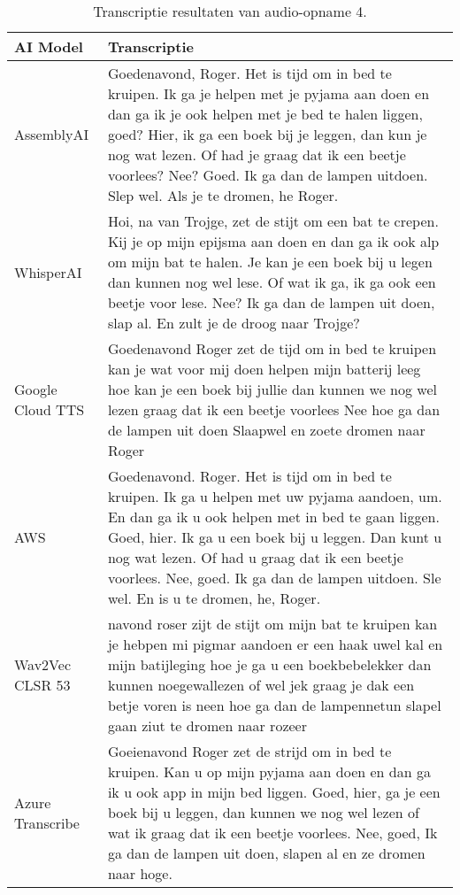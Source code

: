 \begin{table}[htbp]
    \centering
    \caption{Transcriptie resultaten van audio-opname 4.}
    \label{tab:results_sample4}
    \begin{tabularx}{\textwidth}{|l|X|}
        \hline
        \textbf{AI Model} & \textbf{Transcriptie} \\
 \hline
 AssemblyAI &  Goedenavond, Roger. Het is tijd om in bed te kruipen. Ik ga je helpen met je pyjama aan doen en dan ga ik je ook helpen met je bed te halen liggen, goed? Hier, ik ga een boek bij je leggen, dan kun je nog wat lezen. Of had je graag dat ik een beetje voorlees? Nee? Goed. Ik ga dan de lampen uitdoen. Slep wel. Als je te dromen, he Roger.
 

\\ \hline

WhisperAI &    Hoi, na van Trojge, zet de stijt om een bat te crepen. Kij je op mijn epijsma aan doen en dan ga ik ook alp om mijn bat te halen. Je kan je een boek bij u legen dan kunnen nog wel lese. Of wat ik ga, ik ga ook een beetje voor lese. Nee? Ik ga dan de lampen uit doen, slap al. En zult je de droog naar Trojge?


\\ \hline

Google Cloud TTS &   Goedenavond Roger zet de tijd om in bed te kruipen kan je wat voor mij doen helpen mijn batterij leeg hoe kan je een boek bij jullie dan kunnen we nog wel lezen graag dat ik een beetje voorlees Nee hoe ga dan de lampen uit doen Slaapwel en zoete dromen naar Roger


\\ \hline

AWS &   Goedenavond. Roger. Het is tijd om in bed te kruipen. Ik ga u helpen met uw pyjama aandoen, um. En dan ga ik u ook helpen met in bed te gaan liggen. Goed, hier. Ik ga u een boek bij u leggen. Dan kunt u nog wat lezen. Of had u graag dat ik een beetje voorlees. Nee, goed. Ik ga dan de lampen uitdoen. Sle wel. En is u te dromen, he, Roger.


\\ \hline

Wav2Vec CLSR 53 &  navond roser zijt de stijt om mijn bat te kruipen kan je hebpen mi pigmar aandoen er een haak uwel kal en mijn batijleging hoe je ga u een boekbebelekker dan kunnen noegewallezen of wel jek graag je dak een betje voren is neen hoe ga dan de lampennetun slapel gaan ziut te dromen naar rozeer

\\ \hline

Azure Transcribe &  Goeienavond Roger zet de strijd om in bed te kruipen. Kan u op mijn pyjama aan doen en dan ga ik u ook app in mijn bed liggen. Goed, hier, ga je een boek bij u leggen, dan kunnen we nog wel lezen of wat ik graag dat ik een beetje voorlees. Nee, goed, Ik ga dan de lampen uit doen, slapen al en ze dromen naar hoge.
\\ \hline  
    \end{tabularx}
\end{table}
\FloatBarrier
